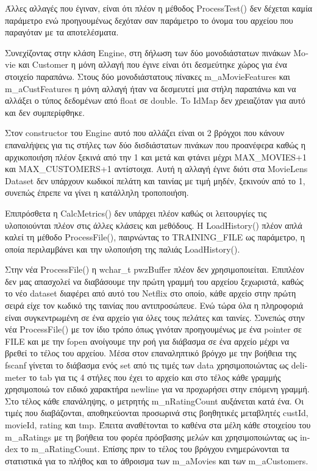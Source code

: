\documentclass{report}
\begin{document}
Άλλες αλλαγές που έγιναν, είναι ότι πλέον η  μέθοδος \textlatin{ProcessTest}() δεν δέχεται καμία παράμετρο ενώ προηγουμένως δεχόταν σαν παράμετρο το όνομα του αρχείου που παραγόταν με τα αποτελέσματα.

Συνεχίζοντας στην κλάση \textlatin{Engine}, στη δήλωση των δύο μονοδιάστατων πινάκων \textlatin{Movie} και \textlatin{Customer} η μόνη αλλαγή που έγινε είναι ότι δεσμεύτηκε χώρος για ένα στοιχείο παραπάνω. Στους δύο μονοδιάστατους πίνακες \textlatin{m\_aMovieFeatures} και \textlatin{m\_aCustFeatures} η μόνη αλλαγή ήταν να δεσμευτεί μια στήλη παραπάνω και να αλλάξει ο τύπος δεδομένων από \textlatin{float} σε \textlatin{double}. To \textlatin{IdMap} δεν χρειαζόταν για αυτό και δεν συμπερίφθηκε. 

Στον \textlatin{constructor} του \textlatin{Engine} αυτό που αλλάζει είναι οι 2 βρόγχοι που κάνουν επαναλήψεις για τις στήλες των δύο δισδιάστατων πινάκων που προανέφερα καθώς η αρχικοποιήση πλέον ξεκινά από την 1 και μετά και φτάνει μέχρι \textlatin{MAX\_MOVIES+1} και \textlatin{MAX\_CUSTOMERS+1} αντίστοιχα. Αυτή η αλλαγή έγινε διότι στα \textlatin{MovieLens Dataset} δεν υπάρχουν κωδικοί πελάτη και ταινίας με τιμή μηδέν, ξεκινούν από το 1, συνεπώς έπρεπε να γίνει η κατάλληλη τροποποιήση.

Επιπρόσθετα η \textlatin{CalcMetrics}() δεν υπάρχει πλέον καθώς οι λειτουργίες τις υλοποιούνται πλέον στις άλλες κλάσεις και μεθόδους. Η \textlatin{LoadHistory}() πλέον απλά καλεί τη μέθοδο \textlatin{ProcessFile}(), παιρνώντας το \textlatin{TRAINING\_FILE} ως παράμετρο, η οποία περιλαμβάνει και την υλοποιήση της παλιάς \textlatin{LoadHistory}().

Στην νέα \textlatin{ProcessFile}() η \textlatin{wchar\_t pwzBuffer} πλέον δεν χρησιμοποιείται. Επιπλέον δεν μας απασχολεί να διαβάσουμε την πρώτη γραμμή του αρχείου ξεχωριστά, καθώς το νέο \textlatin{dataset} διαφέρει από αυτό του \textlatin{Netflix} στο οποίο, κάθε αρχείο στην πρώτη σειρά είχε τον κωδικό της ταινίας που αντιπροσώπευε. Ενώ τώρα όλα η πληροφοριά είναι συγκεντρωμένη σε ένα αρχείο για όλες τους πελάτες και ταινίες. Συνεπώς στην νέα \textlatin{ProcessFile}() με τον ίδιο τρόπο όπως γινόταν προηγουμένως με ένα \textlatin{pointer} σε \textlatin{FILE} και με την \textlatin{fopen} ανοίγουμε την ροή για διάβασμα σε ένα αρχείο  μέχρι να βρεθεί το τέλος του αρχείου. Μέσα στον επαναληπτικό βρόγχο με την βοήθεια της \textlatin{fscanf} γίνεται  το διάβασμα ενός \textlatin{set} από τις τιμές των \textlatin{data} χρησιμοποιώντας ως \textlatin{delimeter} το \textlatin{tab} για τις 4 στήλες που έχει το αρχείο και στο τέλος κάθε γραμμής χρησιμοποιώ τον ειδικό χαρακτήρα \textlatin{newline} για να προχωρήσει στην επόμενη γραμμή. Στο τέλος κάθε επανάληψης, ο μετρητής \textlatin{m\_nRatingCount} αυξάνεται κατά ένα. Οι τιμές που διαβάζονται, αποθηκεύονται προσωρινά στις βοηθητικές μεταβλητές \textlatin{custId, movieId, rating} και \textlatin{tmp}. Έπειτα αναθέτονται το καθένα στα μέλη κάθε στοιχείου του \textlatin{m\_aRatings} με τη βοήθεια του φορέα πρόσβασης μελών και χρησιμοποιώντας ως \textlatin{index}  το \textlatin{m\_aRatingCount}. Επίσης πριν το τέλος του βρόγχου ενημερώνονται τα στατιστικά για το πλήθος και το άθροισμα των \textlatin{m\_aMovies} και των \textlatin{m\_aCustomers}.  
\end{document}
